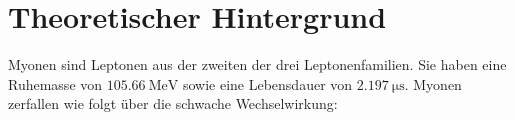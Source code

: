 \section{Theoretischer Hintergrund}
\label{sec:Theorie}
Myonen sind Leptonen aus der zweiten der drei Leptonenfamilien. Sie haben
eine Ruhemasse von $\SI{105.66}{\mega\electronvolt}$ sowie eine Lebensdauer
von $\SI{2.197}{\micro\second}$.
Myonen zerfallen wie folgt über die schwache Wechselwirkung:
